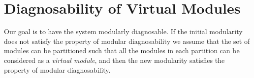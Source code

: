 \documentclass[a4paper, 10pt, conference]{ieeeconf}
\begin{document}
% 	
% 	
% 
% 	
% 
% 
% 	
% 	
% 

\section{Diagnosability of Virtual Modules}
\label{sec:Proposal}

Our goal is to have the system modularly diagnosable. If the initial modularity
does not satisfy the property of modular diagnosability we assume that the set
of modules can be partitioned such that all the modules in each partition can be
considered as a \emph{virtual module}, and then the new modularity satisfies the
property of modular diagnosability.
\end{document}

